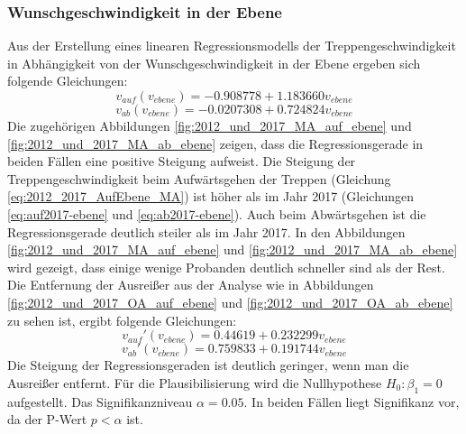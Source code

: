	\subsubsection{Wunschgeschwindigkeit in der Ebene}
	Aus der Erstellung eines linearen Regressionsmodells der Treppengeschwindigkeit in Abhängigkeit von der Wunschgeschwindigkeit in der Ebene ergeben sich folgende Gleichungen:
	\begin{equation}
	v_{auf}(v_{ebene}) = -0.908778 + 1.183660 v_{ebene}
	\label{eq:2012_2017_AufEbene_MA}
	\end{equation}
	\begin{equation}
	v_{ab}(v_{ebene}) = -0.0207308+0.724824 v_{ebene}
	\label{eq:2012_2017_AbEbene_MA}
	\end{equation}
	Die zugehörigen Abbildungen \ref{fig:2012_und_2017_MA_auf_ebene} und \ref{fig:2012_und_2017_MA_ab_ebene} zeigen, dass die Regressionsgerade in beiden Fällen eine positive Steigung aufweist. Die Steigung der Treppengeschwindigkeit beim Aufwärtsgehen der Treppen (Gleichung \ref{eq:2012_2017_AufEbene_MA}) ist höher als im Jahr 2017 (Gleichungen \ref{eq:auf2017-ebene} und \ref{eq:ab2017-ebene}). Auch beim Abwärtsgehen ist die Regressionsgerade deutlich steiler als im Jahr 2017. In den Abbildungen \ref{fig:2012_und_2017_MA_auf_ebene} und \ref{fig:2012_und_2017_MA_ab_ebene} wird gezeigt, dass einige wenige Probanden deutlich schneller sind als der Rest. Die Entfernung der Ausreißer aus der Analyse wie in Abbildungen \ref{fig:2012_und_2017_OA_auf_ebene} und \ref{fig:2012_und_2017_OA_ab_ebene} zu sehen ist, ergibt folgende Gleichungen: 
	\begin{equation}
	v_{auf}'(v_{ebene}) = 0.44619 +0.232299 v_{ebene}
	\label{eq:2012_2017_AufEbene_OA}
	\end{equation}
	\begin{equation}
	v_{ab}'(v_{ebene}) = 0.759833 +0.191744 v_{ebene}
	\label{eq:2012_2017_AbEbene_OA}
	\end{equation}
	Die Steigung der Regressionsgeraden ist deutlich geringer, wenn man die Ausreißer entfernt. 
	Für die Plausibilisierung wird die Nullhypothese $H_0: \beta_1 = 0$ aufgestellt. Das Signifikanzniveau $\alpha= 0.05$. In beiden Fällen liegt Signifikanz vor, da der P-Wert $p<\alpha$ ist.
	
